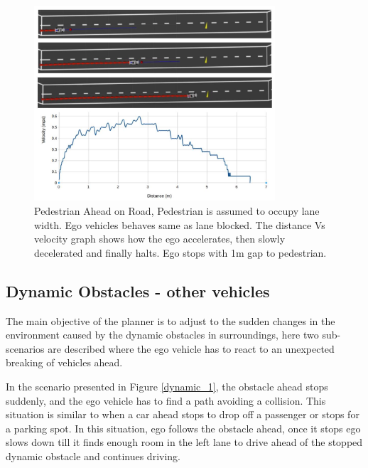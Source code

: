 \begin{figure}
    \centering
    \includegraphics[width=0.8\textwidth]{Images/evaluation/stopping_pedestrian.jpg}
    \caption{Pedestrian Ahead on Road, Pedestrian is assumed to occupy lane width. Ego vehicles behaves same as lane blocked. The distance Vs velocity graph shows how the ego accelerates, then slowly decelerated and finally halts. Ego stops with 1m gap to pedestrian.}
    \label{pedestrian_ahead}
\end{figure}

\subsection{Dynamic Obstacles - other vehicles}
The main objective of the planner is to adjust to the sudden changes in the environment caused by the dynamic obstacles in surroundings, here two sub-scenarios are described where the ego vehicle has to react to an unexpected breaking of vehicles ahead. 

In the scenario presented in Figure \ref{dynamic_1}, the obstacle ahead stops suddenly, and the ego vehicle has to find a path avoiding a collision. This situation is similar to when a car ahead stops to drop off a passenger or stops for a parking spot. In this situation, ego follows the obstacle ahead, once it stops ego slows down till it finds enough room in the left lane to drive ahead of the stopped dynamic obstacle and continues driving. 

\iffalse 

